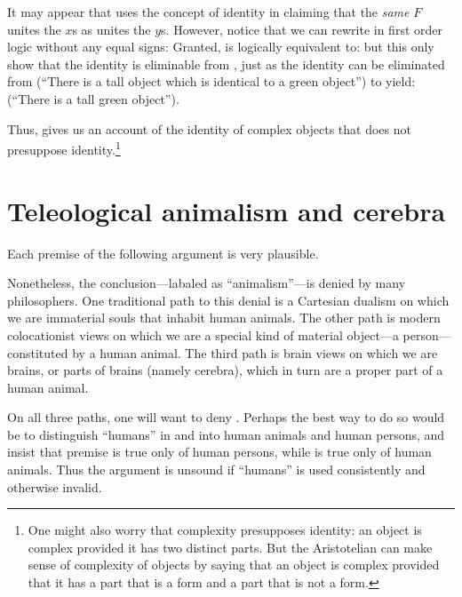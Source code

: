 It may appear that  uses the concept of identity in claiming 
that the \textit{same} $F$ unites the $x$s as unites the $y$s. However, notice that
we can rewrite  in first order logic without any equal signs:
Granted,  is logically equivalent to:
but this only show that the identity is eliminable from ,
just as the identity can be eliminated from
(``There is a tall object which is identical to a green object'') to yield:
(``There is a tall green object'').

Thus,  gives us an account of the identity of complex objects
that does not presuppose identity.\footnote{One might also worry that complexity
presupposes identity: an object is complex provided it has two distinct parts.
But the Aristotelian can make sense of complexity of objects by saying that an
object is complex provided that it has a part that is a form and a part that is not
a form.}

\section{Teleological animalism and cerebra}
Each premise of the following argument is very plausible.

Nonetheless, the conclusion---labaled as ``animalism''---is denied by many philosophers. One traditional path to 
this denial is a Cartesian dualism on which we are immaterial souls that inhabit human animals. The other path 
is modern colocationist views on which we are a special kind of material object---a person---constituted by a human 
animal. The third path is brain views on which we are brains, or parts of brains (namely cerebra), which in turn are a 
proper part of a human animal. 

On all three paths, one will want to deny . Perhaps the best way to do so would be to distinguish ``humans'' 
in  and  into  human animals and human persons, and insist that premise  is true 
only of human persons, while  is true only of human animals. Thus the argument is unsound if ``humans'' is used 
consistently and otherwise invalid. 


